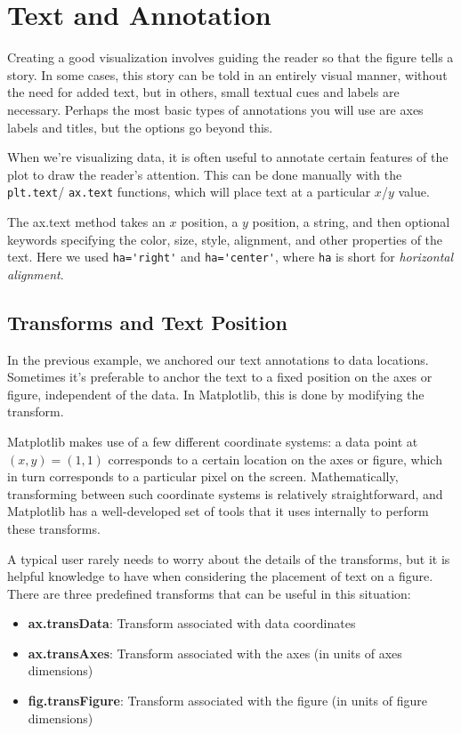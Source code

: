 \chapter{Text and Annotation\label{Ch32}}
Creating a good visualization involves guiding the reader so that the figure tells a
story. In some cases, this story can be told in an entirely visual manner, without the
need for added text, but in others, small textual cues and labels are necessary. Perhaps
the most basic types of annotations you will use are axes labels and titles, but the
options go beyond this.

When we're visualizing data, it is often useful to annotate certain features of
the plot to draw the reader's attention. This can be done manually with the \verb|plt.text|/
\verb|ax.text| functions, which will place text at a particular $x$/$y$ value.

The ax.text method takes an $x$ position, a $y$ position, a string, and then optional keywords specifying the color, size, style, alignment, and other properties of the text.
Here we used \verb|ha='right'| and \verb|ha='center'|, where \verb|ha| is short for \emph{horizontal alignment}.

\section{Transforms and Text Position}
In the previous example, we anchored our text annotations to data locations. Sometimes it's preferable to anchor the text to a fixed position on the axes or figure, independent of the data. In Matplotlib, this is done by modifying the transform.

Matplotlib makes use of a few different coordinate systems: a data point at
$(x, y) = (1, 1)$ corresponds to a certain location on the axes or figure, which in turn
corresponds to a particular pixel on the screen. Mathematically, transforming
between such coordinate systems is relatively straightforward, and Matplotlib has a
well-developed set of tools that it uses internally to perform these transforms.

A typical user rarely needs to worry about the details of the transforms, but it is helpful knowledge to have when considering the placement of text on a figure. There are
three predefined transforms that can be useful in this situation:
\begin{itemize}
    \item \textbf{ax.transData}: Transform associated with data coordinates
    \item \textbf{ax.transAxes}: Transform associated with the axes (in units of axes dimensions)
    \item \textbf{fig.transFigure}: Transform associated with the figure (in units of figure dimensions)
\end{itemize}

